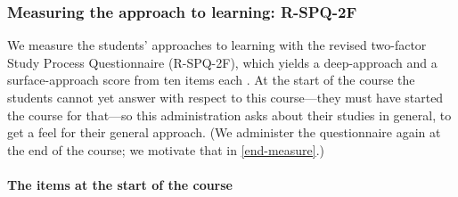 \subsubsection{Measuring the approach to learning: R-SPQ-2F}
\label{approach-measure}

We measure the students' approaches to learning with the revised two-factor
Study Process Questionnaire (R-SPQ-2F), which yields a deep-approach and a
surface-approach score from ten items each \autocite{RSPQ2F}.
At the start of the course the students cannot yet answer with respect to
this course---they must have started the course for that---so this
administration asks about their studies in general, to get a feel for their
general approach.
(We administer the questionnaire again at the end of the course; we
motivate that in \cref{end-measure}.)

\paragraph{The items at the start of the course}

